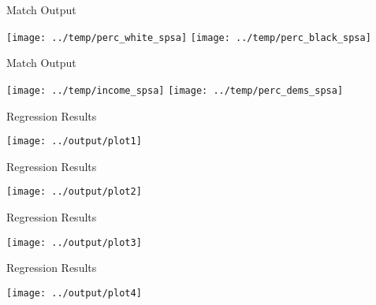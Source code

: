 \documentclass[
  ignorenonframetext,
]{beamer}
\begin{document}
\begin{frame}{Match Output}
\protect\hypertarget{match-output}{}
\begin{center}\texttt{[image: ../temp/perc\_white\_spsa]} \texttt{[image: ../temp/perc\_black\_spsa]} \end{center}
\end{frame}

\begin{frame}{Match Output}
\protect\hypertarget{match-output-1}{}
\begin{center}\texttt{[image: ../temp/income\_spsa]} \texttt{[image: ../temp/perc\_dems\_spsa]} \end{center}
\end{frame}

\begin{frame}{Regression Results}
\protect\hypertarget{regression-results}{}
\begin{center}\texttt{[image: ../output/plot1]} \end{center}
\end{frame}

\begin{frame}{Regression Results}
\protect\hypertarget{regression-results-1}{}
\begin{center}\texttt{[image: ../output/plot2]} \end{center}
\end{frame}

\begin{frame}{Regression Results}
\protect\hypertarget{regression-results-2}{}
\begin{center}\texttt{[image: ../output/plot3]} \end{center}
\end{frame}

\begin{frame}{Regression Results}
\protect\hypertarget{regression-results-3}{}
\begin{center}\texttt{[image: ../output/plot4]} \end{center}
\end{frame}
\end{document}
